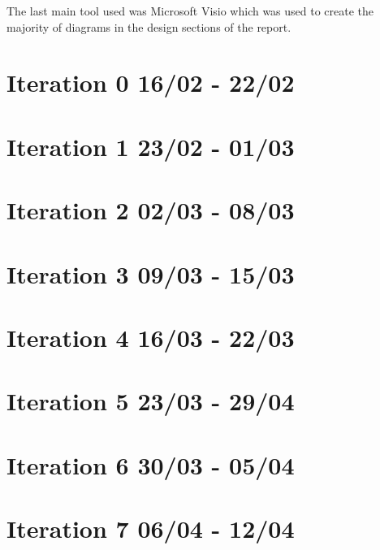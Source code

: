 The last main tool used was Microsoft Visio\cite{visio} which was used to create the majority of diagrams in the design sections of the report.
\newpage

\section{Iteration 0 16/02 - 22/02}


\section{Iteration 1 23/02 - 01/03}



\section{Iteration 2 02/03 - 08/03}



\section{Iteration 3 09/03 - 15/03}



\section{Iteration 4 16/03 - 22/03}



\section{Iteration 5 23/03 - 29/04}



\section{Iteration 6 30/03 - 05/04}



\section{Iteration 7 06/04 - 12/04}



